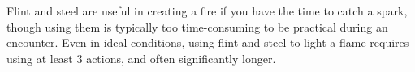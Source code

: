 

Flint and steel are useful in creating a fire if you have the time to catch a spark, 
though using them is typically too time-consuming to be practical during an encounter. 
Even in ideal conditions, using flint and steel to light a flame requires using at least 3 actions, 
and often significantly longer.


\vfill

\ItemBulk{-}
\hfill{}
